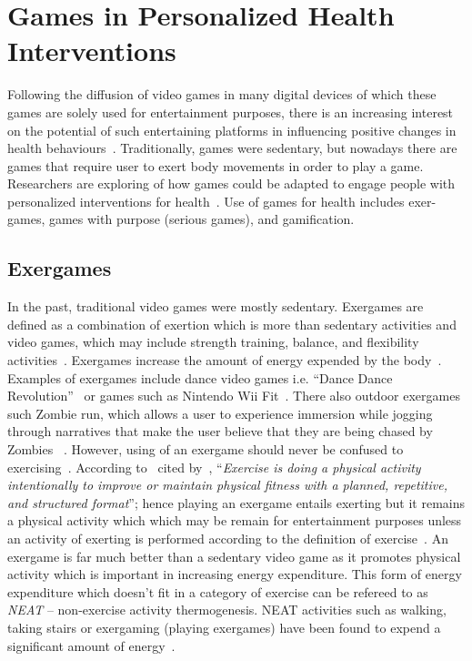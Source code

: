 \section{Games in Personalized Health Interventions}
Following the diffusion of video games in many digital devices of which these games are solely used for entertainment purposes, there is an increasing interest on the potential of such entertaining platforms in influencing positive changes in health behaviours~\citep{king2013gamification}. Traditionally, games were sedentary, but nowadays there are games that require user to exert body movements in order to play a game. Researchers are exploring of how games could be adapted to engage people with personalized interventions for health~\citep{mccallum2012gamification}. Use of games for health includes exer-games, games with purpose (serious games), and gamification.
\subsection{Exergames}
In the past, traditional video games were mostly sedentary. Exergames are defined as a combination of exertion which is more than sedentary activities and video games, which may include strength training, balance, and flexibility activities~\citep{oh2010defining}. Exergames increase the amount of energy expended by the body~\citep{graves2010physiological}. Examples of exergames include  dance video games i.e. ``Dance Dance Revolution''~\citep{lieberman2006dance} or games such as Nintendo Wii Fit~\citep{gobel2010serious}. There also outdoor exergames such Zombie run, which allows a user to experience immersion while jogging through narratives that make the user believe that they are being chased by Zombies ~\citep{southerton2013zombies}. However, using of an exergame should never be confused to exercising~\citep{oh2010defining}. According to~\cite[p. 126]{caspersen1985physical} cited by~\cite{oh2010defining}, ``\emph{Exercise is doing a physical activity intentionally to improve or maintain physical fitness with a planned, repetitive, and structured format}''; hence playing an exergame entails exerting but it remains a physical activity which which may be remain for entertainment purposes unless an activity of exerting is performed according to the definition of exercise~\citep{oh2010defining}. An exergame is far much better than a sedentary video game as it promotes physical activity which is important in increasing energy expenditure. This form of energy expenditure which doesn't fit in a category of exercise can be refereed to as \emph{NEAT} -- non-exercise activity thermogenesis. NEAT activities such as walking, taking stairs or exergaming (playing exergames) have been found to expend a significant amount of energy~\citep{fujiki2008neat}.

